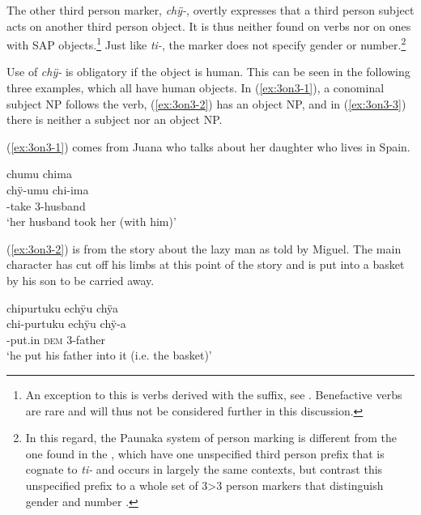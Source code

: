 The other third person marker, \textit{chÿ-}, overtly expresses that a third person subject acts on another third person object. It is thus neither found on  verbs nor on  ones with SAP objects.\footnote{An exception to this is  verbs derived with the  suffix, see . Benefactive verbs are rare and will thus not be considered further in this discussion.} Just like \textit{ti-}, the marker does not specify gender or number.\footnote{In this regard, the Paunaka system of person marking is different from the one found in the , which have one unspecified third person prefix that is cognate to \textit{ti-} and occurs in largely the same contexts, but contrast this unspecified prefix to a whole set of 3>3 person markers that distinguish gender and number \citep[cf.][]{Rose2011a}.} 

Use of \textit{chÿ-} is obligatory if the object is human. This can be seen in the following three examples, which all have human objects. In (\ref{ex:3on3-1}), a conominal subject NP follows the verb, (\ref{ex:3on3-2}) has an object NP, and in (\ref{ex:3on3-3}) there is neither a subject nor an object NP. 

(\ref{ex:3on3-1}) comes from Juana who talks about her daughter who lives in Spain.

\ea\label{ex:3on3-1}
\begingl 
\glpreamble chumu chima\\
\gla chÿ-umu chi-ima\\ 
-take 3-husband\\ 
\glft ‘her husband took her (with him)’\\ 
\endgl
\trailingcitation{[jxx-p110923l-1.240]}
\xe


(\ref{ex:3on3-2}) is from the story about the lazy man as told by Miguel. The main character has cut off his limbs at this point of the story and is put into a basket by his son to be carried away.

\ea\label{ex:3on3-2}
\begingl 
\glpreamble chipurtuku echÿu chÿa\\
\gla chi-purtuku echÿu chÿ-a\\ 
-put.in \textsc{dem} 3-father\\ 
\glft ‘he put his father into it (i.e. the basket)’\\ 
\endgl
\trailingcitation{[mox-n110920l.120]}
\xe

